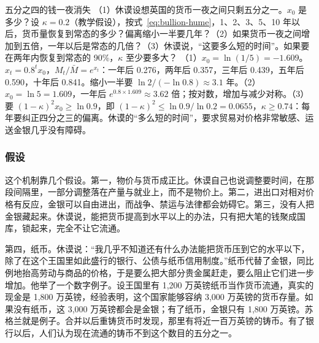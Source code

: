 \begin{example}{五分之四的钱一夜消失}\label{ex:bullion-hume}
（1）休谟设想英国的货币一夜之间只剩五分之一。$x_{0}$ 是多少？设 $\kappa=0.2$（教学假设），按式~\eqref{eq:bullion-hume}，1、2、3、5、10 年以后，货币量恢复到常态的多少？偏离缩小一半要几年？（2）如果货币一夜之间增加到五倍，一年以后是常态的几倍？（3）休谟说，“这要多么短的时间”。如果要在两年内恢复到常态的 90\%，$\kappa$ 至少要多大？
\solution （1）$x_{0}=\ln(1/5)=-1.609$。$x_{t}=0.8^{t}x_{0}$，$M_{t}/\bar M=e^{x_{t}}$：一年后 0.276，两年后 0.357，三年后 0.439，五年后 0.590，十年后 0.841。缩小一半要 $\ln2/(-\ln0.8)\approx3.1$ 年。（2）$x_{0}=\ln5=1.609$，一年后 $e^{0.8\times1.609}\approx3.62$ 倍；按对数，增加与减少对称。（3）要 $(1-\kappa)^{2}x_{0}\ge\ln0.9$，即 $(1-\kappa)^{2}\le\ln0.9/\ln0.2=0.0655$，$\kappa\ge0.74$：每年要纠正四分之三的偏离。休谟的“多么短的时间”，要求贸易对价格非常敏感、运送金银几乎没有障碍。
\end{example}


\subsubsection{假设}
这个机制靠几个假设。第一，物价与货币成正比。休谟自己也说调整要时间，在那段间隔里，一部分调整落在产量与就业上，而不是物价上。第二，进出口对相对价格有反应，金银可以自由进出，而战争、禁运与法律都会妨碍它。第三，没有人把金银藏起来。休谟说，能把货币提高到水平以上的办法，只有把大笔的钱聚成国库，锁起来，完全不让它流通\cite{hume1752}。

第四，纸币。休谟说：“我几乎不知道还有什么办法能把货币压到它的水平以下，除了在这个王国里如此盛行的银行、公债与纸币信用制度。”\cite{hume1752}纸币代替了金银，同比例地抬高劳动与商品的价格，于是要么把大部分贵金属赶走，要么阻止它们进一步增加\cite{hume1752}。他举了一个数字例子。设王国里有 1,200 万英镑纸币当作货币流通，真实的现金是 1,800 万英镑，经验表明，这个国家能够容纳 3,000 万英镑的货币存量\cite{hume1752}。如果没有纸币，这 3,000 万英镑都会是金银；有了纸币，金银只有 1,800 万英镑。苏格兰就是例子。合并以后重铸货币时发现，那里有将近一百万英镑的铸币。有了银行以后，人们认为现在流通的铸币不到这个数目的五分之一\cite{hume1752}。

